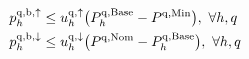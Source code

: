 \documentclass[conference]{IEEEtran}
\begin{document}
{\begin{subequations}
\begin{align}
        \  & p^{\rm{q},\rm{b}, \uparrow}_{h} \leq u_{h}^{\rm{q},\uparrow} \big(P^{\rm{q},\rm{Base}}_{h} - P^{\rm{q},\rm{Min}}\big) , \                                                                                                       \forall{h,q}                                                                             \label{power:9q}                                                                                                                                                                                                                      \\
        \  & p^{\rm{q},\rm{b}, \downarrow}_{h} \leq u^{\rm{q},\downarrow}_{h} \big(P^{\rm{q},\rm{Nom}} -P^{\rm{q},\rm{Base}}_{h}\big), \                                                                                              \forall{h,q}                                                                             \label{power:10q}                                                                                                                                                                                                                            \\

\end{align}
\end{subequations}}
\end{document}
